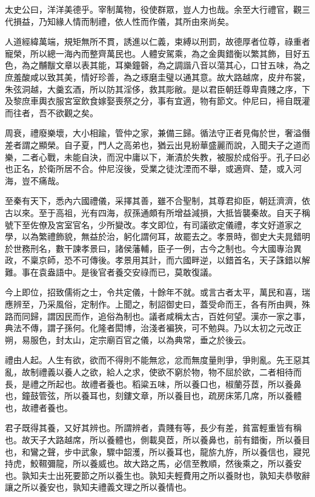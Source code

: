 太史公曰，洋洋美德乎。宰制萬物，役使群眾，豈人力也哉。余至大行禮官，觀三代損益，乃知緣人情而制禮，依人性而作儀，其所由來尚矣。

人道經緯萬端，規矩無所不貫，誘進以仁義，束縛以刑罰，故德厚者位尊，祿重者寵榮，所以總一海內而整齊萬民也。人體安駕乘，為之金輿錯衡以繁其飾，目好五色，為之黼黻文章以表其能，耳樂鐘磬，為之調諧八音以蕩其心，口甘五味，為之庶羞酸咸以致其美，情好珍善，為之琢磨圭璧以通其意。故大路越席，皮弁布裳，朱弦洞越，大羹玄酒，所以防其淫侈，救其彫敝。是以君臣朝廷尊卑貴賤之序，下及黎庶車輿衣服宮室飲食嫁娶喪祭之分，事有宜適，物有節文。仲尼曰，褅自既灌而往者，吾不欲觀之矣。

周衰，禮廢樂壞，大小相踰，管仲之家，兼備三歸。循法守正者見侮於世，奢溢僭差者謂之顯榮。自子夏，門人之高弟也，猶云出見紛華盛麗而說，入聞夫子之道而樂，二者心戰，未能自決，而況中庸以下，漸漬於失教，被服於成俗乎。孔子曰必也正名，於衛所居不合。仲尼沒後，受業之徒沈湮而不舉，或適齊、楚，或入河海，豈不痛哉。

至秦有天下，悉內六國禮儀，采擇其善，雖不合聖制，其尊君抑臣，朝廷濟濟，依古以來。至于高祖，光有四海，叔孫通頗有所增益減損，大抵皆襲秦故。自天子稱號下至佐僚及宮室官名，少所變改。孝文即位，有司議欲定儀禮，孝文好道家之學，以為繁禮飾貌，無益於治，躬化謂何耳，故罷去之。孝景時，御史大夫晁錯明於世務刑名，數干諫孝景曰，諸侯藩輔，臣子一例，古今之制也。今大國專治異政，不稟京師，恐不可傳後。孝景用其計，而六國畔逆，以錯首名，天子誅錯以解難。事在袁盎語中。是後官者養交安祿而已，莫敢復議。

今上即位，招致儒術之士，令共定儀，十餘年不就。或言古者太平，萬民和喜，瑞應辨至，乃采風俗，定制作。上聞之，制詔御史曰，蓋受命而王，各有所由興，殊路而同歸，謂因民而作，追俗為制也。議者咸稱太古，百姓何望。漢亦一家之事，典法不傳，謂子孫何。化隆者閎博，治淺者褊狹，可不勉與。乃以太初之元改正朔，易服色，封太山，定宗廟百官之儀，以為典常，垂之於後云。

禮由人起。人生有欲，欲而不得則不能無忿，忿而無度量則爭，爭則亂。先王惡其亂，故制禮義以養人之欲，給人之求，使欲不窮於物，物不屈於欲，二者相待而長，是禮之所起也。故禮者養也。稻粱五味，所以養口也，椒蘭芬茝，所以養鼻也，鐘鼓管弦，所以養耳也，刻鏤文章，所以養目也，疏房床笫几席，所以養體也，故禮者養也。

君子既得其養，又好其辨也。所謂辨者，貴賤有等，長少有差，貧富輕重皆有稱也。故天子大路越席，所以養體也，側載臭茝，所以養鼻也，前有錯衡，所以養目也，和鸞之聲，步中武象，驟中韶濩，所以養耳也，龍旂九斿，所以養信也，寢兕持虎，鮫韅彌龍，所以養威也。故大路之馬，必信至教順，然後乘之，所以養安也。孰知夫士出死要節之所以養生也。孰知夫輕費用之所以養財也，孰知夫恭敬辭讓之所以養安也，孰知夫禮義文理之所以養情也。

